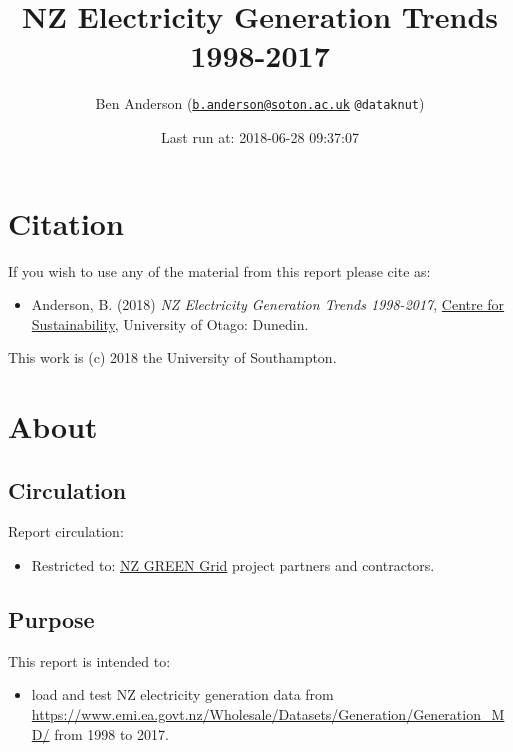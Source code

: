 \documentclass[]{article}
\title{NZ Electricity Generation Trends 1998-2017}
\author{Ben Anderson
(\href{mailto:b.anderson@soton.ac.uk}{\nolinkurl{b.anderson@soton.ac.uk}}
\texttt{@dataknut})}
\date{Last run at: 2018-06-28 09:37:07}
\providecommand{\tightlist}{%
  \setlength{\itemsep}{0pt}\setlength{\parskip}{0pt}}
\theoremstyle{definition}
\theoremstyle{definition}
\theoremstyle{definition}
\theoremstyle{remark}
\begin{document}
\maketitle

{
\setcounter{tocdepth}{2}
\tableofcontents
}
\newpage

\section{Citation}\label{citation}

If you wish to use any of the material from this report please cite as:

\begin{itemize}
\tightlist
\item
  Anderson, B. (2018) \emph{NZ Electricity Generation Trends 1998-2017},
  \href{http://www.otago.ac.nz/centre-sustainability/}{Centre for
  Sustainability}, University of Otago: Dunedin.
\end{itemize}

This work is (c) 2018 the University of Southampton.

\newpage

\section{About}\label{about}

\subsection{Circulation}\label{circulation}

Report circulation:

\begin{itemize}
\tightlist
\item
  Restricted to:
  \href{https://www.otago.ac.nz/centre-sustainability/research/energy/otago050285.html}{NZ
  GREEN Grid} project partners and contractors.
\end{itemize}

\subsection{Purpose}\label{purpose}

This report is intended to:

\begin{itemize}
\tightlist
\item
  load and test NZ electricity generation data from
  \url{https://www.emi.ea.govt.nz/Wholesale/Datasets/Generation/Generation_MD/}
  from 1998 to 2017.
\end{itemize}
\end{document}
